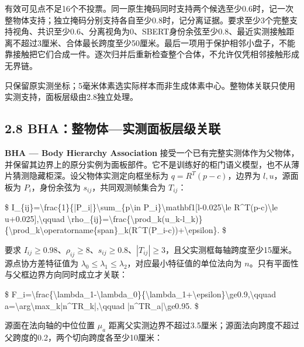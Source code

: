 \documentclass[UTF8,fontset=fandol]{ctexart}
\begin{document}
有效可见点不足16个不投票。同一原生掩码同时支持两个候选至少0.6时，记一次整物体支持；独立掩码分别支持各自至少0.8时，记分离证据。要求至少3个完整支持视角、共识至少0.6、分离视角为0、SBERT身份余弦至少0.8、最近实测接触距离不超过3厘米、合体最长跨度至少50厘米。最后一项用于保护相邻小盘子，不能靠接触把它们合成一件。逐次归并后重新检查整个合体，不允许仅凭相邻接触形成无界链。



只保留原实测坐标；5毫米体素选实际样本而非生成体素中心。整物体关联只使用实测支持，面板层级由2.8独立处理。



\subsection*{2.8 BHA：整物体—实测面板层级关联}

\textbf{BHA — Body Hierarchy Association} 接受一个已有完整实测体作为父物体，并保留其边界上的原分实例为面板部件。它不是训练好的柜门语义模型，也不从薄片猜测隐藏柜深。设父物体实测定向框坐标为 $q=R^T(p-c)$，边界为 $l,u$，源面板为 $P_i$，身份余弦为 $s_{ij}$，共同观测帧集合为 $T_{ij}$：



\$
I\_\{ij\}=\textbackslash{}frac\{1\}\{|P\_i|\}\textbackslash{}sum\_\{p\textbackslash{}in P\_i\}\textbackslash{}mathbf1[l-0.025\textbackslash{}le R\textasciicircum{}T(p-c)\textbackslash{}le u+0.025],\textbackslash{}qquad
\textbackslash{}rho\_\{ij\}=\textbackslash{}frac\{\textbackslash{}prod\_k(u\_k-l\_k)\}\{\textbackslash{}prod\_k\textbackslash{}operatorname\{span\}\_k(R\textasciicircum{}T(P\_i-c))+\textbackslash{}epsilon\}.
\$



要求 $I_{ij}\ge0.98$、$\rho_{ij}\ge8$、$s_{ij}\ge0.8$、$|T_{ij}|\ge3$，且父实测框每轴跨度至少15厘米。源点协方差特征值为 $\lambda_0\le\lambda_1\le\lambda_2$，对应最小特征值的单位法向为 $n$。只有平面性与父框边界方向同时成立才关联：



\$
F\_i=\textbackslash{}frac\{\textbackslash{}lambda\_1-\textbackslash{}lambda\_0\}\{\textbackslash{}lambda\_1+\textbackslash{}epsilon\}\textbackslash{}ge0.9,\textbackslash{}qquad
a=\textbackslash{}arg\textbackslash{}max\_k|n\textasciicircum{}TR\_k|,\textbackslash{}qquad |n\textasciicircum{}TR\_a|\textbackslash{}ge0.95.
\$



源面在法向轴的中位位置 $\mu_a$ 距离父实测边界不超过3.5厘米；源面法向跨度不超过父跨度的0.2，两个切向跨度各至少10厘米：
\end{document}
